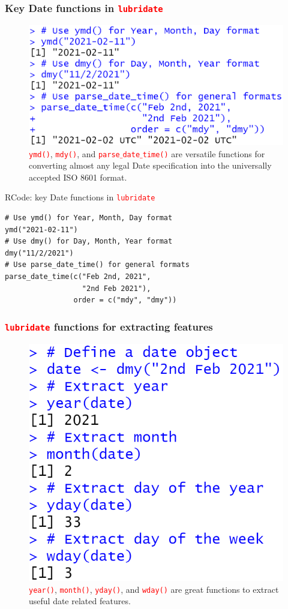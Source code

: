 \documentclass{beamer}
\begin{document}
\begin{frame}\frametitle{Key Date functions in \texttt{\textcolor{red}{lubridate}}}
\begin{figure}
\includegraphics[width=0.99\linewidth]{PlotsLec4/LubDateFns}
\caption{{\small \texttt{\textcolor{red}{ymd()}}, \texttt{\textcolor{red}{mdy()}}, and \texttt{\textcolor{red}{parse$\_$date$\_$time()}} are versatile functions for converting almost any legal Date specification into the universally accepted ISO 8601 format.}}
\end{figure}
\end{frame}


\begin{frame}[fragile]{RCode: key Date functions in \texttt{\textcolor{red}{lubridate}}}
\begin{lstlisting}
# Use ymd() for Year, Month, Day format
ymd("2021-02-11")
# Use dmy() for Day, Month, Year format
dmy("11/2/2021")
# Use parse_date_time() for general formats
parse_date_time(c("Feb 2nd, 2021",
                  "2nd Feb 2021"),
                order = c("mdy", "dmy"))
\end{lstlisting}
\end{frame}

\begin{frame}\frametitle{\texttt{\textcolor{red}{lubridate}} functions for extracting features}
\begin{figure}
\includegraphics[width=0.70\linewidth]{PlotsLec4/DateFeatures}
\caption{{\small \texttt{\textcolor{red}{year()}}, \texttt{\textcolor{red}{month()}}, \texttt{\textcolor{red}{yday()}}, and \texttt{\textcolor{red}{wday()}} are great functions to extract useful date related features.}}
\end{figure}
\end{frame}
\end{document}
